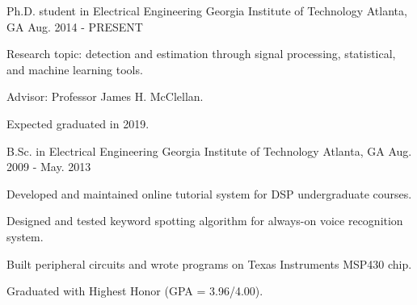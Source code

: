

\begin{cventries}

  \cventry
    {Ph.D. student in Electrical Engineering} %
    {Georgia Institute of Technology} %
    {Atlanta, GA} %
    {Aug. 2014 - PRESENT} %
    {
      \begin{cvitems} %
        \item {Research topic: detection and estimation through signal processing, statistical, and machine learning tools.}
        \item {Advisor: Professor James H. McClellan.}
        \item {Expected graduated in 2019.}
      \end{cvitems}
    }
    
  \cventry
    {B.Sc. in Electrical Engineering} %
    {Georgia Institute of Technology} %
    {Atlanta, GA} %
    {Aug. 2009 - May. 2013} %
    {
      \begin{cvitems} %
        \item {Developed and maintained online tutorial system for DSP undergraduate courses.}
        \item {Designed and tested keyword spotting algorithm for always-on voice recognition system.}
        \item {Built peripheral circuits and wrote programs on Texas Instruments MSP430 chip.}
        \item {Graduated with Highest Honor (GPA = 3.96/4.00).}
      \end{cvitems}
    }

\end{cventries}
